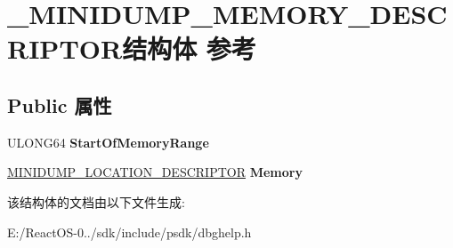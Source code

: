 \hypertarget{struct___m_i_n_i_d_u_m_p___m_e_m_o_r_y___d_e_s_c_r_i_p_t_o_r}{}\section{\+\_\+\+M\+I\+N\+I\+D\+U\+M\+P\+\_\+\+M\+E\+M\+O\+R\+Y\+\_\+\+D\+E\+S\+C\+R\+I\+P\+T\+O\+R结构体 参考}
\label{struct___m_i_n_i_d_u_m_p___m_e_m_o_r_y___d_e_s_c_r_i_p_t_o_r}
\subsection*{Public 属性}
\begin{DoxyCompactItemize}
\item 
\mbox{\label{struct___m_i_n_i_d_u_m_p___m_e_m_o_r_y___d_e_s_c_r_i_p_t_o_r_a68ddabb5cebb4e1ff384894c06f488ab}} 
U\+L\+O\+N\+G64 {\bfseries Start\+Of\+Memory\+Range}
\item 
\mbox{\label{struct___m_i_n_i_d_u_m_p___m_e_m_o_r_y___d_e_s_c_r_i_p_t_o_r_a73e28238fcf99c0bf8b6c66afe7403c4}} 
\hyperlink{struct___m_i_n_i_d_u_m_p___l_o_c_a_t_i_o_n___d_e_s_c_r_i_p_t_o_r}{M\+I\+N\+I\+D\+U\+M\+P\+\_\+\+L\+O\+C\+A\+T\+I\+O\+N\+\_\+\+D\+E\+S\+C\+R\+I\+P\+T\+OR} {\bfseries Memory}
\end{DoxyCompactItemize}


该结构体的文档由以下文件生成\+:\begin{DoxyCompactItemize}
\item 
E\+:/\+React\+O\+S-\/0../sdk/include/psdk/dbghelp.\+h\end{DoxyCompactItemize}
